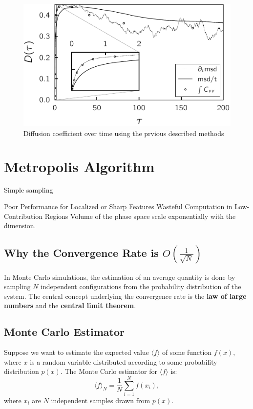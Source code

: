 \documentclass[ansiapaper]{report}
\begin{document}
\begin{multicols}{3}
\begin{figure}[H]
    \begin{center}
        \includegraphics[width=1\linewidth]{figures/diffusion_calculation.pdf}
    \end{center}
    \caption{Diffusion coefficient over time using the prvious described methods}\label{fig:diffusion-calculation}
\end{figure}

\chapter{Metropolis Algorithm}
Simple sampling


Poor Performance for Localized or Sharp Features
Wasteful Computation in Low-Contribution Regions
Volume of the phase space scale exponentially with the dimension.

\section*{Why the Convergence Rate is \( O(\frac{1}{\sqrt{N}}) \)}

In Monte Carlo simulations, the estimation of an average quantity is done by sampling \( N \) independent configurations from the probability distribution of the system. The central concept underlying the convergence rate is the \textbf{law of large numbers} and the \textbf{central limit theorem}.

\section*{Monte Carlo Estimator}

Suppose we want to estimate the expected value \( \langle f \rangle \) of some function \( f(x) \), where \( x \) is a random variable distributed according to some probability distribution \( p(x) \). The Monte Carlo estimator for \( \langle f \rangle \) is:
\[
\langle f \rangle_N = \frac{1}{N} \sum_{i=1}^N f(x_i),
\]
where \( x_i \) are \( N \) independent samples drawn from \( p(x) \).


\end{multicols}
\end{document}
